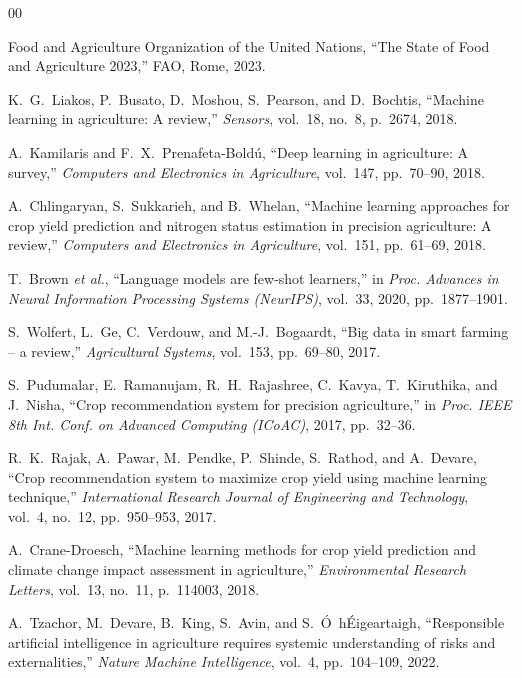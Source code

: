 \documentclass[conference]{IEEEtran}
\begin{document}
\begin{thebibliography}{00}

Food and Agriculture Organization of the United Nations, ``The State of Food and Agriculture 2023,'' FAO, Rome, 2023.

K.~G.~Liakos, P.~Busato, D.~Moshou, S.~Pearson, and D.~Bochtis, ``Machine learning in agriculture: A review,'' \textit{Sensors}, vol.~18, no.~8, p.~2674, 2018.

A.~Kamilaris and F.~X.~Prenafeta-Bold\'{u}, ``Deep learning in agriculture: A survey,'' \textit{Computers and Electronics in Agriculture}, vol.~147, pp.~70--90, 2018.

A.~Chlingaryan, S.~Sukkarieh, and B.~Whelan, ``Machine learning approaches for crop yield prediction and nitrogen status estimation in precision agriculture: A review,'' \textit{Computers and Electronics in Agriculture}, vol.~151, pp.~61--69, 2018.

T.~Brown \textit{et al.}, ``Language models are few-shot learners,'' in \textit{Proc. Advances in Neural Information Processing Systems (NeurIPS)}, vol.~33, 2020, pp.~1877--1901.

S.~Wolfert, L.~Ge, C.~Verdouw, and M.-J.~Bogaardt, ``Big data in smart farming -- a review,'' \textit{Agricultural Systems}, vol.~153, pp.~69--80, 2017.

S.~Pudumalar, E.~Ramanujam, R.~H.~Rajashree, C.~Kavya, T.~Kiruthika, and J.~Nisha, ``Crop recommendation system for precision agriculture,'' in \textit{Proc. IEEE 8th Int. Conf. on Advanced Computing (ICoAC)}, 2017, pp.~32--36.

R.~K.~Rajak, A.~Pawar, M.~Pendke, P.~Shinde, S.~Rathod, and A.~Devare, ``Crop recommendation system to maximize crop yield using machine learning technique,'' \textit{International Research Journal of Engineering and Technology}, vol.~4, no.~12, pp.~950--953, 2017.

A.~Crane-Droesch, ``Machine learning methods for crop yield prediction and climate change impact assessment in agriculture,'' \textit{Environmental Research Letters}, vol.~13, no.~11, p.~114003, 2018.

A.~Tzachor, M.~Devare, B.~King, S.~Avin, and S.~\'{O}~h\'{E}igeartaigh, ``Responsible artificial intelligence in agriculture requires systemic understanding of risks and externalities,'' \textit{Nature Machine Intelligence}, vol.~4, pp.~104--109, 2022.


\end{thebibliography}
\end{document}
